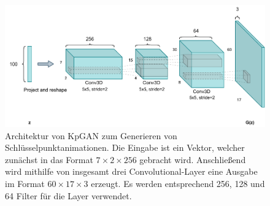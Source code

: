 \begin{figure}
    \includegraphics[width=\textwidth]{images/KpGAN.pdf}
    \caption{Architektur von KpGAN zum Generieren von Schlüs\-sel\-punkt\-anima\-tionen. Die Eingabe ist ein Vektor, welcher zunächst in das Format $7 \times 2 \times 256$ gebracht wird. Anschließend wird mithilfe von insgesamt drei Convolutional-Layer eine Ausgabe im Format $60 \times 17 \times 3$ erzeugt. Es werden entsprechend 256, 128 und 64 Filter für die Layer verwendet.}
    \label{fig:kpgan}
\end{figure}
